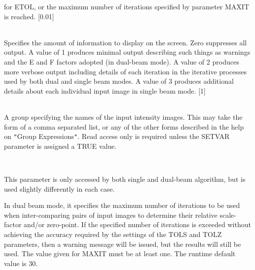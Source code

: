 \documentclass[twoside,11pt]{article}
\renewcommand{\_}{\texttt{\symbol{95}}}
\newcommand{\sstsubsection}[1]{ \item[{#1}] \mbox{} \\}
\newcommand{\sstsubsection}[1]{\item[{#1}]}
\begin{document}
{{{         for ETOL, or the maximum number of iterations specified by parameter
         MAXIT is reached. [0.01]
      }
      \sstsubsection{
         ILEVEL = \_INTEGER (Read)
      }{
         Specifies the amount of information to display on the screen.
         Zero suppresses all output. A value of 1 produces minimal output
         describing such things as warnings and the E and F factors
         adopted (in dual-beam mode). A value of 2 produces more verbose
         output including details of each iteration in the iterative
         processes used by both dual and single beam modes. A value of
         3 produces additional details about each individual input image in
         single beam mode. [1]
      }
      \sstsubsection{
         IN = NDF (Update)
      }{
         A group specifying the names of the input intensity images. This
         may take the form of a comma separated list, or any of the other
         forms described in the help on {\tt "}Group Expressions{\tt "}. Read access
         only is required unless the SETVAR parameter is assigned a TRUE
         value.
      }
      \sstsubsection{
         MAXIT = \_INTEGER (Read)
      }{
         This parameter is only accessed by both single and dual-beam
         algorithm, but is used slightly differently in each case.

         In dual beam mode, it specifies the maximum number of iterations
         to be used when inter-comparing pairs of input images to determine
         their relative scale-factor and/or zero-point. If the specified
         number of iterations is exceeded without achieving the accuracy
         required by the settings of the TOLS and TOLZ parameters, then a
         warning message will be issued, but the results will still be used.
         The value given for MAXIT must be at least one. The runtime
         default value is 30.

}}}
\end{document}
